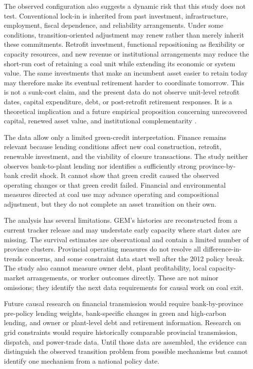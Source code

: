 \documentclass[11pt]{article}
\begin{document}
The observed configuration also suggests a dynamic risk that this study does not test. Conventional lock-in is inherited from past investment, infrastructure, employment, fiscal dependence, and reliability arrangements. Under some conditions, transition-oriented adjustment may renew rather than merely inherit these commitments. Retrofit investment, functional repositioning as flexibility or capacity resources, and new revenue or institutional arrangements may reduce the short-run cost of retaining a coal unit while extending its economic or system value. The same investments that make an incumbent asset easier to retain today may therefore make its eventual retirement harder to coordinate tomorrow. This is not a sunk-cost claim, and the present data do not observe unit-level retrofit dates, capital expenditure, debt, or post-retrofit retirement responses. It is a theoretical implication and a future empirical proposition concerning unrecovered capital, renewed asset value, and institutional complementarity \parencite{arthur1989,pierson2000,mahoney2000,unruh2000}.

The data allow only a limited green-credit interpretation. Finance remains relevant because lending conditions affect new coal construction, retrofit, renewable investment, and the viability of closure transactions. The study neither observes bank-to-plant lending nor identifies a sufficiently strong province-by-bank credit shock. It cannot show that green credit caused the observed operating changes or that green credit failed. Financial and environmental measures directed at coal use may advance operating and compositional adjustment, but they do not complete an asset transition on their own.

The analysis has several limitations. GEM's histories are reconstructed from a current tracker release and may understate early capacity where start dates are missing. The survival estimates are observational and contain a limited number of province clusters. Provincial operating measures do not resolve all difference-in-trends concerns, and some constraint data start well after the 2012 policy break. The study also cannot measure owner debt, plant profitability, local capacity-market arrangements, or worker outcomes directly. These are not minor omissions; they identify the next data requirements for causal work on coal exit.

Future causal research on financial transmission would require bank-by-province pre-policy lending weights, bank-specific changes in green and high-carbon lending, and owner or plant-level debt and retirement information. Research on grid constraints would require historically comparable provincial transmission, dispatch, and power-trade data. Until those data are assembled, the evidence can distinguish the observed transition problem from possible mechanisms but cannot identify one mechanism from a national policy date.
\end{document}
